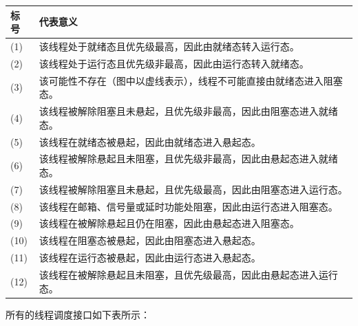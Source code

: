 {\def\LTcaptype{none} %
\begin{longtable}[]{@{}
  >{\raggedright\arraybackslash}p{}
  >{\raggedright\arraybackslash}p{}@{}}
\toprule\noalign{}
\begin{minipage}[b]{\linewidth}\raggedright
标号
\end{minipage} & \begin{minipage}[b]{\linewidth}\raggedright
代表意义
\end{minipage} \\
\midrule\noalign{}
\endhead
\bottomrule\noalign{}
\endlastfoot
(1) & 该线程处于就绪态且优先级最高，因此由就绪态转入运行态。 \\
(2) & 该线程处于运行态且优先级非最高，因此由运行态转入就绪态。 \\
(3) &
该可能性不存在（图中以虚线表示），线程不可能直接由就绪态进入阻塞态。 \\
(4) &
该线程被解除阻塞且未悬起，且优先级非最高，因此由阻塞态进入就绪态。 \\
(5) & 该线程在就绪态被悬起，因此由就绪态进入悬起态。 \\
(6) &
该线程被解除悬起且未阻塞，且优先级非最高，因此由悬起态进入就绪态。 \\
(7) &
该线程被解除阻塞且未悬起，且优先级最高，因此由阻塞态进入运行态。 \\
(8) & 该线程在邮箱、信号量或延时功能处阻塞，因此由运行态进入阻塞态。 \\
(9) & 该线程在被解除悬起且仍在阻塞，因此由悬起态进入阻塞态。 \\
(10) & 该线程在阻塞态被悬起，因此由阻塞态进入悬起态。 \\
(11) & 该线程在运行态被悬起，因此由运行态进入悬起态。 \\
(12) &
该线程在被解除悬起且未阻塞，且优先级最高，因此由悬起态进入运行态。 \\
\end{longtable}
}

所有的线程调度接口如下表所示：

\label{tab:thread-scheduling-interface-summary}

